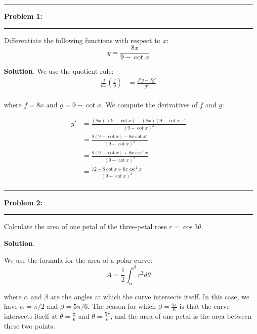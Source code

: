 \documentclass[11pt]{article}
\newcommand\question[2]{\vspace{.25in}\hrule\textbf{#1: #2}\vspace{.5em}\hrule\vspace{.10in}}
\begin{document}
\raggedright
\newcommand\NAME{Carl Kingsford}  %
\newcommand\ANDREWID{ckingsf}     %
\newcommand\HWNUM{1}              %

\newcommand{\sumn}{\sum_{n=0}^{\infty}}
\newcommand{\ea}{e^{\alpha}}
\newcommand{\nea}{e^{-\alpha}}

\question{Problem 1}{}
Differentiate the following functions with respect to $x$:
\[y=\frac{8x}{9-\cot x}\]

\textbf{Solution}.
We use the quotient rule:
\begin{align*}
\frac{d}{dx}\left(\frac{f}{g}\right)&=\frac{f'g-fg'}{g^2}\\
\end{align*}

where $f=8x$ and $g=9-\cot x$.  We compute the derivatives of $f$ and $g$:

\begin{align*}
y'&=\frac{(8x)'(9-\cot x)-(8x)(9-\cot x)'}{(9-\cot x)^2}\\
  &= \frac{8(9-\cot x)-8x\cot x'}{(9-\cot x)^2}\\
  &= \frac{8(9-\cot x)+8x\csc^2 x}{(9-\cot x)^2}\\
  &= \frac{72-8\cot x+8x\csc^2 x}{(9-\cot x)^2}\\
\end{align*}

\question{Problem 2}{}
Calculate the area of one petal of the three-petal rose $r=\cos 3\theta$.

\textbf{Solution}.

We use the formula for the area of a polar curve:
\[A=\frac{1}{2}\int_{\alpha}^{\beta}r^2d\theta\]

where $\alpha$ and $\beta$ are the angles at which the curve intersects itself.  In this case, we have $\alpha=\pi/2$ and $\beta=5\pi/6$.
The reason for which $\beta = \frac{5\pi}{6}$ is that the curve intersects itself at $\theta = \frac{\pi}{6}$ and $\theta = \frac{5\pi}{6}$, and the area of one petal is the area between these two points.
\end{document}
